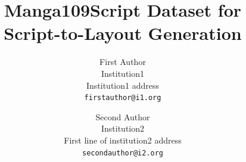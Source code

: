 \documentclass[10pt,twocolumn,letterpaper]{article}
\title{Manga109Script Dataset for Script-to-Layout Generation}
\author{First Author\\
Institution1\\
Institution1 address\\
{\tt\small firstauthor@i1.org}
\and
Second Author\\
Institution2\\
First line of institution2 address\\
{\tt\small secondauthor@i2.org}
}
\begin{document}
\maketitle
    





% 
% 
{
    \small
    
    
}
\end{document}
